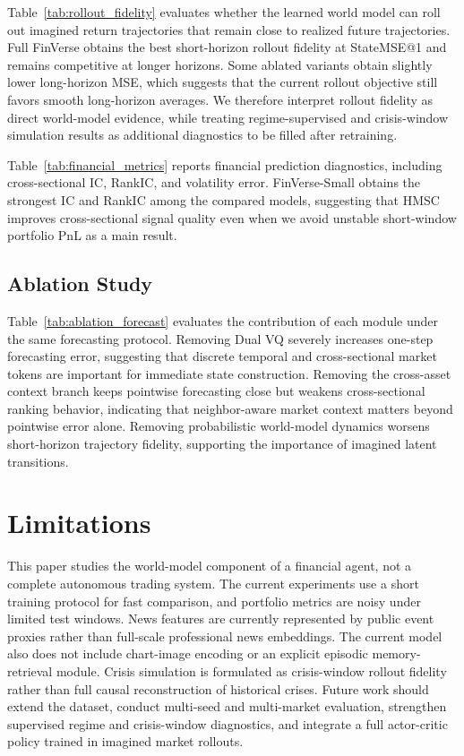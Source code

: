 \documentclass[letterpaper]{article}
\begin{document}
Table~\ref{tab:rollout_fidelity} evaluates whether the learned world model can roll out imagined return trajectories that remain close to realized future trajectories. Full FinVerse obtains the best short-horizon rollout fidelity at StateMSE@1 and remains competitive at longer horizons. Some ablated variants obtain slightly lower long-horizon MSE, which suggests that the current rollout objective still favors smooth long-horizon averages. We therefore interpret rollout fidelity as direct world-model evidence, while treating regime-supervised and crisis-window simulation results as additional diagnostics to be filled after retraining.

Table~\ref{tab:financial_metrics} reports financial prediction diagnostics, including cross-sectional IC, RankIC, and volatility error. FinVerse-Small obtains the strongest IC and RankIC among the compared models, suggesting that HMSC improves cross-sectional signal quality even when we avoid unstable short-window portfolio PnL as a main result.

\subsection{Ablation Study}
Table~\ref{tab:ablation_forecast} evaluates the contribution of each module under the same forecasting protocol. Removing Dual VQ severely increases one-step forecasting error, suggesting that discrete temporal and cross-sectional market tokens are important for immediate state construction. Removing the cross-asset context branch keeps pointwise forecasting close but weakens cross-sectional ranking behavior, indicating that neighbor-aware market context matters beyond pointwise error alone. Removing probabilistic world-model dynamics worsens short-horizon trajectory fidelity, supporting the importance of imagined latent transitions.

\section{Limitations}
This paper studies the world-model component of a financial agent, not a complete autonomous trading system. The current experiments use a short training protocol for fast comparison, and portfolio metrics are noisy under limited test windows. News features are currently represented by public event proxies rather than full-scale professional news embeddings. The current model also does not include chart-image encoding or an explicit episodic memory-retrieval module. Crisis simulation is formulated as crisis-window rollout fidelity rather than full causal reconstruction of historical crises. Future work should extend the dataset, conduct multi-seed and multi-market evaluation, strengthen supervised regime and crisis-window diagnostics, and integrate a full actor-critic policy trained in imagined market rollouts.
\end{document}
